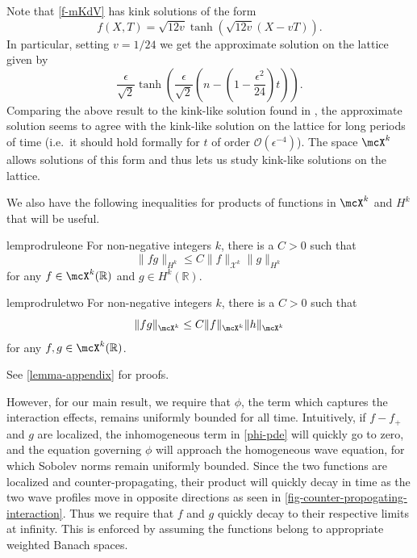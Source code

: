 \documentclass[oneside,reqno]{amsart}
\begin{document}
Note that \cref{f-mKdV} has kink solutions of the form
\begin{equation}\label{kink-solutions}
	f(X,T) = \sqrt{12 v} \tanh\left( \sqrt{12v} (X-vT)\right).
\end{equation}
In particular, setting \(v = 1/24\) we get the approximate solution on the lattice given by
\begin{equation*}
	\frac \epsilon {\sqrt 2} \tanh\left(\frac \epsilon {\sqrt 2} \left(n - \left(1-\frac{\epsilon^2} {24}\right) t\right)\right).
\end{equation*} 
Comparing the above result to the kink-like solution found in \cite{norton2023kinklike}, the approximate solution seems to agree with the kink-like solution on the lattice for long periods of time (i.e.\ it should hold formally for \(t\) of order \(\mathcal O(\epsilon^{-4})\)). The space \(\mcX^k\) allows solutions of this form and thus lets us study kink-like solutions on the lattice.

We also have the following inequalities for products of functions in \(\mcX^k\) and \(H^k\) that will be useful. 


\begin{restatable}{lem}{prodruleone}
	\label{prod-rule-1-lem}
	For non-negative integers \(k\), there is a \(C>0\) such that
	\begin{equation}\label{prod_rule}
		\| fg \|_{H^k} \leq C \| f \|_{\mathcal X^k} \| g \|_{H^k}
	\end{equation}
	for any \(f\in \mcX^k(\mathbb R)\) and \(g \in H^k(\mathbb R)\).
\end{restatable}

\begin{restatable}{lem}{prodruletwo}
	\label{prod-rule-2-lem}
	For non-negative integers \(k\), there is a \(C>0\) such that
	\begin{equation*}%
		\| fg \|_{\mcX^k} \leq C \| f \|_{\mcX^k} \| h \|_{\mcX^k}
	\end{equation*}
	for any \(f,g\in \mcX^k(\mathbb R)\).
\end{restatable}
See \cref{lemma-appendix} for proofs.

However, for our main result, we require that \(\phi\), the term which captures the interaction effects, remains uniformly bounded for all time. Intuitively, if \(f- f_+\) and \(g\) are localized, the inhomogeneous term in \cref{phi-pde} will quickly go to zero, and the equation governing \(\phi\) will approach the homogeneous wave equation, for which Sobolev norms remain uniformly bounded. Since the two functions are localized and counter-propagating, their product will quickly decay in time as the two wave profiles move in opposite directions as seen in \cref{fig-counter-propogating-interaction}. Thus we require that \(f\) and \(g\) quickly decay to their respective limits at infinity. This is enforced by assuming the functions belong to appropriate weighted Banach spaces.
\end{document}
